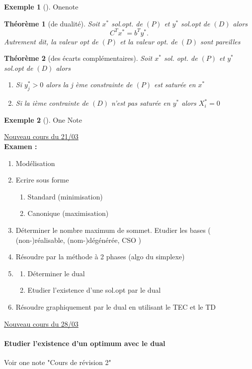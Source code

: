 \documentclass{article}
\theoremstyle{plain}%
\newtheorem{thm}{Théorème}[section]
\theoremstyle{definition}
\newtheorem{exmp}{Exemple}[section]
\theoremstyle{remark}
\begin{document}
\begin{exmp}[]
    Onenote
\end{exmp}

\begin{thm}[de dualité]
    Soit $ x^* $ sol.opt. de $ (P) $ et $ y^* $ sol.opt de $ (D) $ alors 
    \[
        C^T x^* = b^T y^*
    .\]
    Autrement dit, la valeur opt de $ (P) $ et la valeur opt. de $ (D) $ sont pareilles
\end{thm}

\begin{thm}[des écarts complémentaires]
    Soit $ x^* $ sol. opt. de $ (P) $ et $ y^* $ sol.opt de $ (D) $ alors \begin{enumerate}
        \item Si $ y_j^* >0 $ alors la j ème constrainte de $ (P) $ est saturée en $ x^* $ 
        \item Si la ième contrainte de $ (D) $ n'est pas saturée en $ y^* $ alors $ X_i^* = 0 $ 
    \end{enumerate}
\end{thm}

\begin{exmp}[]
    One Note
\end{exmp}

\underline{Nouveau cours du 21/03} \\

\textbf{Examen :}
\begin{enumerate}
    \item Modélisation 
    \item Ecrire sous forme \begin{enumerate}
        \item Standard (minimisation)
        \item Canonique (maximisation)
    \end{enumerate}
    \item Déterminer le nombre maximum de sommet. Etudier les bases ( (non-)réalisable, (nom-)dégénérée, CSO )
    \item Résoudre par la méthode à 2 phases (algo du simplexe)
    \item \begin{enumerate}
        \item Déterminer le dual
        \item Etudier l'existence d'une sol.opt par le dual
    \end{enumerate}
    \item Résoudre graphiquement par le dual en utilisant le TEC et le TD
\end{enumerate}


\underline{Nouveau cours du 28/03} \\
\paragraph*{Etudier l'existence d'un optimum avec le dual}
Voir one note "Cours de révision 2"
\end{document}
